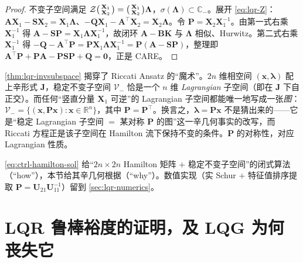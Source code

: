 \begin{proof}
不变子空间满足 $\mathcal Z\begin{psmallmatrix}\mathbf X_1\\\mathbf X_2\end{psmallmatrix}=\begin{psmallmatrix}\mathbf X_1\\\mathbf X_2\end{psmallmatrix}\boldsymbol\Lambda$，$\sigma(\boldsymbol\Lambda)\subset\mathbb C_-$。展开 \cref{eq:lqr-Z}：$\mathbf A\mathbf X_1-\mathbf S\mathbf X_2=\mathbf X_1\boldsymbol\Lambda$、$-\mathbf Q\mathbf X_1-\mathbf A^\top\mathbf X_2=\mathbf X_2\boldsymbol\Lambda$。令 $\mathbf P=\mathbf X_2\mathbf X_1^{-1}$。由第一式右乘 $\mathbf X_1^{-1}$ 得 $\mathbf A-\mathbf S\mathbf P=\mathbf X_1\boldsymbol\Lambda\mathbf X_1^{-1}$，故闭环 $\mathbf A-\mathbf B\mathbf K$ 与 $\boldsymbol\Lambda$ 相似、Hurwitz。第二式右乘 $\mathbf X_1^{-1}$ 得 $-\mathbf Q-\mathbf A^\top\mathbf P=\mathbf P\mathbf X_1\boldsymbol\Lambda\mathbf X_1^{-1}=\mathbf P(\mathbf A-\mathbf S\mathbf P)$，整理即 $\mathbf A^\top\mathbf P+\mathbf P\mathbf A-\mathbf P\mathbf S\mathbf P+\mathbf Q=\mathbf0$，正是 CARE。
\end{proof}

\begin{insight}
\cref{thm:lqr-invsubspace} 揭穿了 Riccati Ansatz 的“魔术”。$2n$ 维相空间 $(\mathbf x,\boldsymbol\lambda)$ 配上辛形式 $\mathbf J$，稳定不变子空间 $\mathcal V_-$ 恰是一个 $n$ 维 \emph{Lagrangian} 子空间（即在 $\mathbf J$ 下自正交）。而任何“竖直分量 $\mathbf X_1$ 可逆”的 Lagrangian 子空间都能唯一地写成一张\emph{图}：$\mathcal V_-=\{(\mathbf x,\mathbf P\mathbf x):\mathbf x\in\mathbb R^n\}$，其中 $\mathbf P=\mathbf P^\top$。换言之，$\boldsymbol\lambda=\mathbf P\mathbf x$ 不是猜出来的——它是“稳定 Lagrangian 子空间 $=$ 某对称 $\mathbf P$ 的图”这一辛几何事实的改写，而 Riccati 方程正是该子空间在 Hamilton 流下保持不变的条件。$\mathbf P$ 的对称性，对应 Lagrangian 性质。
\end{insight}

\begin{remark}[与导论的分工]
\cref{eq:ctrl-hamilton-sol} 给“$2n\times2n$ Hamilton 矩阵 $+$ 稳定不变子空间”的闭式算法（“how”），本节给其辛几何根据（“why”）。数值实现（实 Schur $+$ 特征值排序提取 $\mathbf P=\mathbf U_{21}\mathbf U_{11}^{-1}$）留到 \cref{sec:lqr-numerics}。
\end{remark}

\section{LQR 鲁棒裕度的证明，及 LQG 为何丧失它}
\label{sec:lqr-margins}

